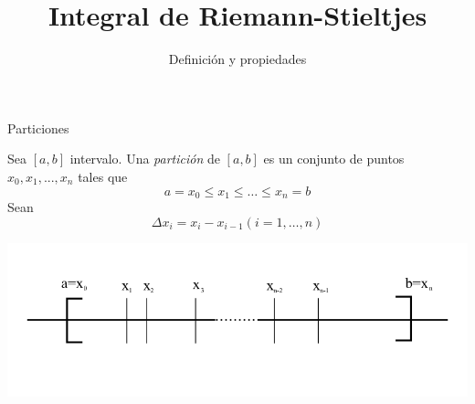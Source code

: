 \documentclass[11pt]{beamer}
\author{Definición y propiedades}
\title{Integral de Riemann-Stieltjes}
\begin{document}
\begin{frame}
\titlepage
\end{frame}


\begin{frame}{Particiones}

\begin{definition}
Sea $[a, b]$ intervalo. Una \textit{partición} de $[a, b]$ es un conjunto de puntos $x_0, x_1,..., x_n$ tales que
\begin{equation*}
	a = x_0 \leq x_1 \leq \dots \leq x_n = b
\end{equation*}
Sean
\begin{equation*}
	\Delta x_i = x_i - x_{i-1} (i = 1, \dots, n)
\end{equation*}
\end{definition}

\begin{center}
\includegraphics[scale=1]{img/particion.png}
\end{center}

\end{frame}
\end{document}

